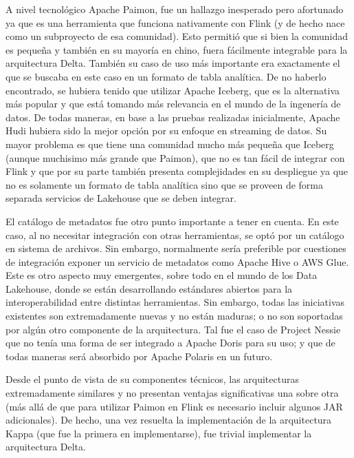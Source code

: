 \newpage

A nivel tecnológico Apache Paimon, fue un hallazgo inesperado pero afortunado ya que es una herramienta que funciona nativamente con Flink (y de hecho nace como un subproyecto de esa comunidad).
Esto permitió que si bien la comunidad es pequeña y también en su mayoría en chino, fuera fácilmente integrable para la arquitectura Delta. 
También su caso de uso más importante era exactamente el que se buscaba en este caso en un formato de tabla analítica. 
De no haberlo encontrado, se hubiera tenido que utilizar Apache Iceberg, que es la alternativa más popular y que está tomando más relevancia en el mundo de la ingenería de datos. 
De todas maneras, en base a las pruebas realizadas inicialmente, Apache Hudi hubiera sido la mejor opción por su enfoque en streaming de datos. 
Su mayor problema es que tiene una comunidad mucho más pequeña que Iceberg (aunque muchisimo más grande que Paimon), que no es tan fácil de integrar con Flink 
y que por su parte también presenta complejidades en su despliegue ya que no es solamente un formato de tabla analítica sino que se proveen de forma separada servicios de Lakehouse que se deben integrar. 

El catálogo de metadatos fue otro punto importante a tener en cuenta. En este caso, al no necesitar integración con otras herramientas,
se optó por un catálogo en sistema de archivos. Sin embargo, normalmente sería preferible por cuestiones de integración exponer un servicio de metadatos como Apache Hive o AWS Glue.
Este es otro aspecto muy emergentes, sobre todo en el mundo de los Data Lakehouse, donde se están desarrollando estándares abiertos para la interoperabilidad entre distintas herramientas.
Sin embargo, todas las iniciativas existentes son extremadamente nuevas y no están maduras; o no son soportadas por algún otro componente de la arquitectura. 
Tal fue el caso de Project Nessie que no tenía una forma de ser integrado a Apache Doris para su uso; y que de todas maneras será absorbido por Apache Polaris en un futuro.

Desde el punto de vista de su componentes técnicos, las arquitecturas extremadamente similares y no presentan ventajas significativas una sobre otra 
(más allá de que para utilizar Paimon en Flink es necesario incluir algunos JAR adicionales).
De hecho, una vez resuelta la implementación de la arquitectura Kappa (que fue la primera en implementarse), fue trivial implementar la arquitectura Delta. 

\newpage